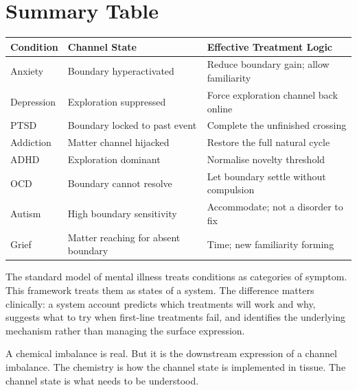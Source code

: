 \documentclass[12pt]{article}
\begin{document}
\section{Summary Table}

\begin{center}
\begin{tabular}{lll}
\toprule
Condition & Channel State & Effective Treatment Logic \\
\midrule
Anxiety    & Boundary hyperactivated          & Reduce boundary gain; allow familiarity \\
Depression & Exploration suppressed           & Force exploration channel back online \\
PTSD       & Boundary locked to past event    & Complete the unfinished crossing \\
Addiction  & Matter channel hijacked          & Restore the full natural cycle \\
ADHD       & Exploration dominant             & Normalise novelty threshold \\
OCD        & Boundary cannot resolve          & Let boundary settle without compulsion \\
Autism     & High boundary sensitivity        & Accommodate; not a disorder to fix \\
Grief      & Matter reaching for absent boundary & Time; new familiarity forming \\
\bottomrule
\end{tabular}
\end{center}

The standard model of mental illness treats conditions as categories of symptom.
This framework treats them as states of a system. The difference matters
clinically: a system account predicts which treatments will work and why, suggests
what to try when first-line treatments fail, and identifies the underlying
mechanism rather than managing the surface expression.

A chemical imbalance is real. But it is the downstream expression of a channel
imbalance. The chemistry is how the channel state is implemented in tissue. The
channel state is what needs to be understood.
\end{document}
